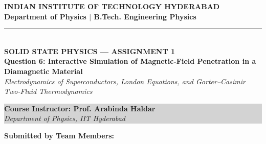 \documentclass[11pt,a4paper]{article}
\begin{document}
\begin{titlepage}
    \centering
    \vspace*{0.5cm}
    
    {\Huge \textbf{\color{navyblue} INDIAN INSTITUTE OF TECHNOLOGY HYDERABAD}}\\[0.3cm]
    {\Large \textbf{\color{darkgray} Department of Physics $|$ B.Tech. Engineering Physics}}\\[0.4cm]
    \textcolor{navyblue}{\rule{\textwidth}{1.5pt}}\\[0.8cm]
    
    {\large \textbf{\color{crimson} SOLID STATE PHYSICS --- ASSIGNMENT 1}}\\[0.3cm]
    {\LARGE \textbf{\color{navyblue} Question 6: Interactive Simulation of Magnetic-Field Penetration in a Diamagnetic Material}}\\[0.4cm]
    {\large \textit{Electrodynamics of Superconductors, London Equations, and Gorter--Casimir Two-Fluid Thermodynamics}}\\[1.0cm]
    
    \begin{center}
    \colorbox{lightgray}{
        \begin{minipage}{0.85\textwidth}
            \centering
            \vspace{0.25cm}
            {\large \textbf{\color{navyblue} Course Instructor: Prof. Arabinda Haldar}}\\[0.15cm]
            {\normalsize \textit{Department of Physics, IIT Hyderabad}}
            \vspace{0.25cm}
        \end{minipage}
    }
    \end{center}
    
    \vspace{0.8cm}
    {\large \textbf{\color{navyblue} Submitted by Team Members:}}\\[0.3cm]
    

\end{titlepage}
\end{document}

